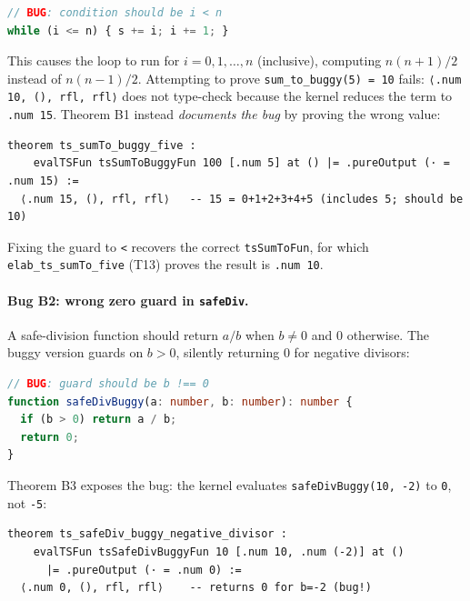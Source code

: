 \begin{lstlisting}[language=TypeScript,caption={Buggy TypeScript sum\_to.},label={lst:buggysum}]
// BUG: condition should be i < n
while (i <= n) { s += i; i += 1; }
\end{lstlisting}

\noindent
This causes the loop to run for $i = 0, 1, \ldots, n$ (inclusive), computing
$n(n{+}1)/2$ instead of $n(n{-}1)/2$.
Attempting to prove \texttt{sum\_to\_buggy(5) = 10} fails:
\texttt{⟨.num 10, (), rfl, rfl⟩} does not type-check because the kernel
reduces the term to \texttt{.num 15}.
Theorem B1 instead \emph{documents the bug} by proving the wrong value:

\begin{lstlisting}[caption={B1: kernel confirms the off-by-one bug.},label={lst:b1}]
theorem ts_sumTo_buggy_five :
    evalTSFun tsSumToBuggyFun 100 [.num 5] at () |= .pureOutput (· = .num 15) :=
  ⟨.num 15, (), rfl, rfl⟩   -- 15 = 0+1+2+3+4+5 (includes 5; should be 10)
\end{lstlisting}

\noindent
Fixing the guard to \texttt{<} recovers the correct \texttt{tsSumToFun}, for which
\texttt{elab\_ts\_sumTo\_five} (T13) proves the result is \texttt{.num 10}.

\paragraph{Bug B2: wrong zero guard in \texttt{safeDiv}.}
A safe-division function should return $a/b$ when $b \neq 0$ and $0$
otherwise.  The buggy version guards on $b > 0$, silently returning $0$
for negative divisors:

\begin{lstlisting}[language=TypeScript,caption={Buggy TypeScript safeDiv.},label={lst:buggydiv}]
// BUG: guard should be b !== 0
function safeDivBuggy(a: number, b: number): number {
  if (b > 0) return a / b;
  return 0;
}
\end{lstlisting}

\noindent
Theorem B3 exposes the bug: the kernel evaluates \texttt{safeDivBuggy(10,~-2)}
to \texttt{0}, not \texttt{-5}:

\begin{lstlisting}[caption={B3: kernel exposes the wrong-guard bug.},label={lst:b3}]
theorem ts_safeDiv_buggy_negative_divisor :
    evalTSFun tsSafeDivBuggyFun 10 [.num 10, .num (-2)] at ()
      |= .pureOutput (· = .num 0) :=
  ⟨.num 0, (), rfl, rfl⟩    -- returns 0 for b=-2 (bug!)
\end{lstlisting}

